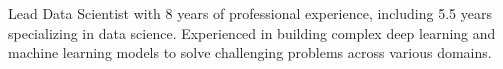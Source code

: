 

\begin{cvparagraph}

Lead Data Scientist with 8 years of professional experience, including 5.5 
years specializing in data science. Experienced in building complex deep 
learning and machine learning models to solve challenging problems across 
various domains.
\end{cvparagraph}

